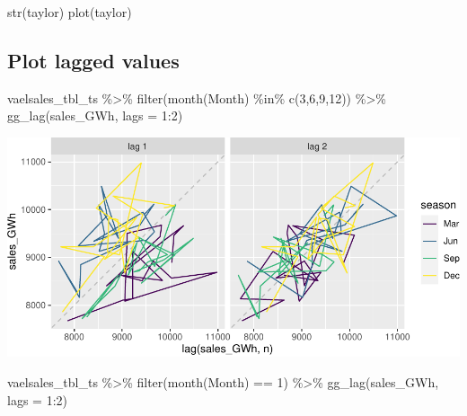 \documentclass[
]{book}
\newenvironment{Shaded}{\begin{snugshade}}{\end{snugshade}}
\newcommand{\AttributeTok}[1]{\textcolor[rgb]{0.77,0.63,0.00}{#1}}
\newcommand{\DecValTok}[1]{\textcolor[rgb]{0.00,0.00,0.81}{#1}}
\newcommand{\FunctionTok}[1]{\textcolor[rgb]{0.00,0.00,0.00}{#1}}
\newcommand{\NormalTok}[1]{#1}
\newcommand{\SpecialCharTok}[1]{\textcolor[rgb]{0.00,0.00,0.00}{#1}}
\begin{document}
\begin{Shaded}
\begin{Highlighting}[]
\FunctionTok{str}\NormalTok{(taylor)}
\FunctionTok{plot}\NormalTok{(taylor)}
\end{Highlighting}
\end{Shaded}

\hypertarget{plot-lagged-values}{%
\subsection{Plot lagged values}\label{plot-lagged-values}}

\begin{Shaded}
\begin{Highlighting}[]
\NormalTok{vaelsales\_tbl\_ts  }\SpecialCharTok{\%\textgreater{}\%} \FunctionTok{filter}\NormalTok{(}\FunctionTok{month}\NormalTok{(Month) }\SpecialCharTok{\%in\%} \FunctionTok{c}\NormalTok{(}\DecValTok{3}\NormalTok{,}\DecValTok{6}\NormalTok{,}\DecValTok{9}\NormalTok{,}\DecValTok{12}\NormalTok{)) }\SpecialCharTok{\%\textgreater{}\%} \FunctionTok{gg\_lag}\NormalTok{(sales\_GWh, }\AttributeTok{lags =} \DecValTok{1}\SpecialCharTok{:}\DecValTok{2}\NormalTok{)}
\end{Highlighting}
\end{Shaded}

\includegraphics{graphics/plot lagged values-1.pdf}

\begin{Shaded}
\begin{Highlighting}[]
\NormalTok{vaelsales\_tbl\_ts  }\SpecialCharTok{\%\textgreater{}\%} \FunctionTok{filter}\NormalTok{(}\FunctionTok{month}\NormalTok{(Month) }\SpecialCharTok{==} \DecValTok{1}\NormalTok{) }\SpecialCharTok{\%\textgreater{}\%} \FunctionTok{gg\_lag}\NormalTok{(sales\_GWh, }\AttributeTok{lags =} \DecValTok{1}\SpecialCharTok{:}\DecValTok{2}\NormalTok{)}
\end{Highlighting}
\end{Shaded}
\end{document}
